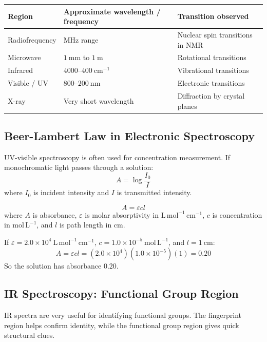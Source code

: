 \documentclass[12pt,a4paper]{article}
\begin{document}
\begin{tabularx}{\linewidth}{|B{3.0cm}|Y|Y|}
\hline
\textbf{Region} & \textbf{Approximate wavelength / frequency} & \textbf{Transition observed} \\
\hline
Radiofrequency & MHz range & Nuclear spin transitions in NMR \\
\hline
Microwave & $1\ \mathrm{mm}$ to $1\ \mathrm{m}$ & Rotational transitions \\
\hline
Infrared & $4000$--$400\ \mathrm{cm^{-1}}$ & Vibrational transitions \\
\hline
Visible / UV & $800$--$200\ \mathrm{nm}$ & Electronic transitions \\
\hline
X-ray & Very short wavelength & Diffraction by crystal planes \\
\hline
\end{tabularx}

\subsection{Beer-Lambert Law in Electronic Spectroscopy}
UV-visible spectroscopy is often used for concentration measurement. If monochromatic light passes through a solution:
\[
A=\log\frac{I_0}{I}
\]
where $I_0$ is incident intensity and $I$ is transmitted intensity.

\begin{tcolorbox}[formulabox, title={Beer-Lambert Law}]
\[
A=\varepsilon c l
\]
where $A$ is absorbance, $\varepsilon$ is molar absorptivity in $\mathrm{L\,mol^{-1}\,cm^{-1}}$, $c$ is concentration in $\mathrm{mol\,L^{-1}}$, and $l$ is path length in cm.
\end{tcolorbox}

\begin{tcolorbox}[examplebox, title={Solved Example: Absorbance}]
If $\varepsilon=2.0\times10^4\ \mathrm{L\,mol^{-1}\,cm^{-1}}$, $c=1.0\times10^{-5}\ \mathrm{mol\,L^{-1}}$, and $l=1\ \mathrm{cm}$:
\[
A=\varepsilon cl=(2.0\times10^4)(1.0\times10^{-5})(1)=0.20
\]
So the solution has absorbance $0.20$.
\end{tcolorbox}

\subsection{IR Spectroscopy: Functional Group Region}
IR spectra are very useful for identifying functional groups. The fingerprint region helps confirm identity, while the functional group region gives quick structural clues.
\end{document}
